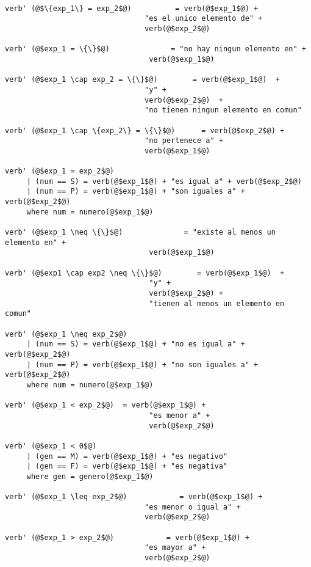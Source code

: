 \documentclass{article}
\begin{document}
\begin{verbatim}

verb' (@$\{exp_1\} = exp_2$@)          = verb(@$exp_1$@) + 
                                "es el unico elemento de" + 
                                verb(@$exp_2$@)

verb' (@$exp_1 = \{\}$@)              = "no hay ningun elemento en" + 
                                 verb(@$exp_1$@) 

verb' (@$exp_1 \cap exp_2 = \{\}$@)        = verb(@$exp_1$@)  +  
                                "y" +  
                                verb(@$exp_2$@)  +  
                                "no tienen ningun elemento en comun"

verb' (@$exp_1 \cap \{exp_2\} = \{\}$@)      = verb(@$exp_2$@) +  
                                "no pertenece a" +  
                                verb(@$exp_1$@) 

verb' (@$exp_1 = exp_2$@)
     | (num == S) = verb(@$exp_1$@) + "es igual a" + verb(@$exp_2$@) 
     | (num == P) = verb(@$exp_1$@) + "son iguales a" + verb(@$exp_2$@) 
     where num = numero(@$exp_1$@)

verb' (@$exp_1 \neq \{\}$@)              = "existe al menos un elemento en" +  
                                 verb(@$exp_1$@) 

verb' (@$exp1 \cap exp2 \neq \{\}$@)        = verb(@$exp_1$@)  +  
                                 "y" +  
                                 verb(@$exp_2$@) +  
                                 "tienen al menos un elemento en comun" 

verb' (@$exp_1 \neq exp_2$@)
     | (num == S) = verb(@$exp_1$@) + "no es igual a" + verb(@$exp_2$@) 
     | (num == P) = verb(@$exp_1$@) + "no son iguales a" + verb(@$exp_2$@) 
     where num = numero(@$exp_1$@)

verb' (@$exp_1 < exp_2$@)  = verb(@$exp_1$@) +  
                                 "es menor a" +  
                                 verb(@$exp_2$@) 

verb' (@$exp_1 < 0$@)
     | (gen == M) = verb(@$exp_1$@) + "es negativo" 
     | (gen == F) = verb(@$exp_1$@) + "es negativa" 
     where gen = genero(@$exp_1$@)
                                 
verb' (@$exp_1 \leq exp_2$@)            = verb(@$exp_1$@) +  
                                "es menor o igual a" +  
                                verb(@$exp_2$@) 

verb' (@$exp_1 > exp_2$@)            = verb(@$exp_1$@) +  
                                "es mayor a" +  
                                verb(@$exp_2$@) 


\end{verbatim}
\end{document}
